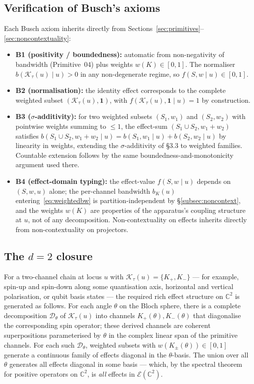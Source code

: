 \documentclass[11pt,a4paper]{article}
\begin{document}
\subsection{Verification of Busch's axioms}

Each Busch axiom inherits directly from Sections~\ref{sec:primitives}--\ref{sec:noncontextuality}:

\begin{itemize}
  \item \textbf{B1 (positivity / boundedness):} automatic from non-negativity of bandwidth (Primitive~04) plus weights $w(K) \in [0, 1]$. The normaliser $b(\mathcal{K}_\tau(u) \mid u) > 0$ in any non-degenerate regime, so $f(S, w \mid u) \in [0, 1]$.
  \item \textbf{B2 (normalisation):} the identity effect corresponds to the complete weighted subset $(\mathcal{K}_\tau(u), \mathbf{1})$, with $f(\mathcal{K}_\tau(u), \mathbf{1} \mid u) = 1$ by construction.
  \item \textbf{B3 ($\sigma$-additivity):} for two weighted subsets $(S_1, w_1)$ and $(S_2, w_2)$ with pointwise weights summing to $\leq 1$, the effect-sum $(S_1 \cup S_2, w_1 + w_2)$ satisfies $b(S_1 \cup S_2, w_1 + w_2 \mid u) = b(S_1, w_1 \mid u) + b(S_2, w_2 \mid u)$ by linearity in weights, extending the $\sigma$-additivity of \S 3.3 to weighted families. Countable extension follows by the same boundedness-and-monotonicity argument used there.
  \item \textbf{B4 (effect-domain typing):} the effect-value $f(S, w \mid u)$ depends on $(S, w, u)$ alone; the per-channel bandwidth $b_K(u)$ entering~\eqref{eq:weightedbw} is partition-independent by \S\ref{subsec:noncontext}, and the weights $w(K)$ are properties of the apparatus's coupling structure at $u$, not of any decomposition. Non-contextuality on effects inherits directly from non-contextuality on projectors.
\end{itemize}

\subsection{The $d = 2$ closure}

For a two-channel chain at locus $u$ with $\mathcal{K}_\tau(u) = \{K_+, K_-\}$ --- for example, spin-up and spin-down along some quantisation axis, horizontal and vertical polarisation, or qubit basis states --- the required rich effect structure on $\mathbb{C}^2$ is generated as follows. For each angle $\theta$ on the Bloch sphere, there is a complete decomposition $\mathcal{D}_\theta$ of $\mathcal{K}_\tau(u)$ into channels $K_+(\theta), K_-(\theta)$ that diagonalise the corresponding spin operator; these derived channels are coherent superpositions parameterised by $\theta$ in the complex linear span of the primitive channels. For each such $\mathcal{D}_\theta$, weighted subsets with $w(K_\pm(\theta)) \in [0, 1]$ generate a continuous family of effects diagonal in the $\theta$-basis. The union over all $\theta$ generates all effects diagonal in some basis --- which, by the spectral theorem for positive operators on $\mathbb{C}^2$, is \emph{all} effects in $\mathcal{E}(\mathbb{C}^2)$.
\end{document}
